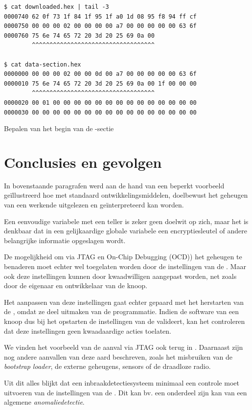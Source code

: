 \begin{listing}[ht]
  \begin{verbatim}
$ cat downloaded.hex | tail -3
0000740 62 0f 73 1f 84 1f 95 1f a0 1d 08 95 f8 94 ff cf
0000750 00 00 00 02 00 00 00 00 a7 00 00 00 00 00 63 6f
0000760 75 6e 74 65 72 20 3d 20 25 69 0a 00
        ^^^^^^^^^^^^^^^^^^^^^^^^^^^^^^^^^^^

$ cat data-section.hex
0000000 00 00 00 02 00 00 0d 00 a7 00 00 00 00 00 63 6f
0000010 75 6e 74 65 72 20 3d 20 25 69 0a 00 1f 00 00 00
        ^^^^^^^^^^^^^^^^^^^^^^^^^^^^^^^^^^^
0000020 00 01 00 00 00 00 00 00 00 00 00 00 00 00 00 00
0000030 00 00 00 00 00 00 00 00 00 00 00 00 00 00 00 00
  \end{verbatim}
  \vspace{-5mm}
  \caption{Bepalen van het begin van de -sectie}
  \label{lst:determine-bss}
\end{listing}

\section{Conclusies en gevolgen}

In bovenstaande paragrafen werd aan de hand van een beperkt voorbeeld
ge\"illustreerd hoe met standaard ontwikkelingsmiddelen, doelbewust het
geheugen van een werkende \mcu uitgelezen en ge\"interpreteerd kan worden.

Een eenvoudige variabele met een teller is zeker geen doelwit op zich, maar het
is denkbaar dat in een gelijkaardige globale variabele een encryptiesleutel of
andere belangrijke informatie opgeslagen wordt.

De mogelijkheid om via JTAG en On-Chip Debugging (OCD)) het geheugen te
benaderen moet echter wel toegelaten worden door de instellingen van de \mcu.
Maar ook deze instellingen kunnen door kwaadwilligen aangepast worden, net
zoals door de eigenaar en ontwikkelaar van de knoop.

Het aanpassen van deze instellingen gaat echter gepaard met het herstarten van
de \mcu, omdat ze deel uitmaken van de programmatie. Indien de software van een
knoop dus bij het opstarten de instellingen van de \mcu valideert, kan het
controleren dat deze instellingen geen kwaadaardige acties toelaten.

We vinden het voorbeeld van de aanval via JTAG ook terug in
\citep{becher2006tampering}. Daarnaast zijn nog andere aanvallen van deze aard
beschreven, zoals het misbruiken van de \emph{bootstrap loader}, de externe
geheugens, sensors of de draadloze radio.

Uit dit alles blijkt dat een inbraakdetectiesysteem minimaal een controle moet
uitvoeren van de instellingen van de \mcu. Dit kan bv. een onderdeel zijn kan
van een algemene \emph{anomaliedetectie}.

